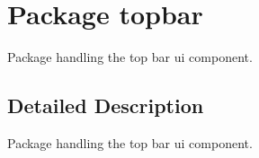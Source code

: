 \hypertarget{namespacetopbar}{\section{Package topbar}
\label{namespacetopbar}
}


Package handling the top bar ui component.  




\subsection{Detailed Description}
Package handling the top bar ui component. 